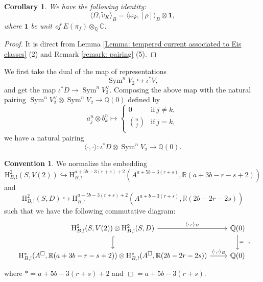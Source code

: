 \documentclass[11pt, a4paper]{amsart}
\theoremstyle{plain}
\newtheorem{corollary}[theorem]{Corollary}
\theoremstyle{definition}
\newtheorem{convention}[theorem]{Convention}
\numberwithin{equation}{section}
\def\CC{\mathbb{C}}
\def\QQ{\mathbb{Q}}
\def\RR{\mathbb{R}}
\DeclareMathOperator{\Sym}{Sym}
\begin{document}
\begin{corollary}
\label{corollary: Omega pairing in terms of omega paring with rho}
    We have the following identity: 
    \begin{equation*}
        \langle \Omega, \tilde{v}_{K} \rangle_{B} = \langle \omega_{\Psi}, [\rho] \rangle_{B} \otimes \mathbf{1}, 
    \end{equation*}
    where $\mathbf{1}$ be unit of $E(\pi_f) \otimes_{\QQ} \CC$. 
\end{corollary}

\begin{proof}
    It is direct from Lemma \ref{Lemma: tempered current associated to Eis classes} (2) and Remark \ref{remark: pairing} (5). 
\end{proof}

We first take the dual of the map of representations
\begin{equation*}
    \Sym^{n}V_{2} \hookrightarrow \iota^{*} V,
\end{equation*}
 and get the map $\iota^{*} D \rightarrow \Sym^{n}V_{2}^{\vee} $. 
Composing the above map with the natural pairing $\Sym^{n}V_2^{\vee} \otimes \Sym^{n} V_2 \rightarrow \QQ(0)$ defined by 
\begin{equation*}
    a^{n}_{j} \otimes b^{n}_{k} \mapsto \begin{cases}
                                            0 & \text{if} \ j \neq k, \\
                                            \binom{n}{j} & \text{if} \ j = k,   \\
                                        \end{cases}
\end{equation*}
we have a natural pairing 
\begin{equation*}
    \langle \cdot, \cdot \rangle \colon \iota^{*}D \otimes \Sym^{n} V_2 \rightarrow \QQ(0). 
\end{equation*} 

\begin{convention}
We normalize the embedding 
\begin{equation*}
\mathrm{H}^{2}_{B, !}(S, V(2)) \hookrightarrow \mathrm{H}^{a + 5b - 3(r + s) + 2}_{B, !}(A^{a + 5b - 3(r + s)}, \RR(a + 3b -r -s + 2))
\end{equation*}
and 
\begin{equation*}
\mathrm{H}^{2}_{B, !}(S, D) \hookrightarrow \mathrm{H}^{a + 5b - 3(r + s) + 2}_{B, !}(A^{a + b - 3(r + s)}, \RR(2b - 2r - 2s))
\end{equation*}
such that we have the following commutative diagram: 
\[
    \begin{tikzcd}
        \mathrm{H}^{2}_{B, !}(S, V(2)) \otimes \mathrm{H}^{2}_{B, !}(S, D)  \ar[d, hook] \ar[r,"{\langle \cdot , \cdot \rangle_B}"] & \QQ(0) \ar[d, "="] \\
        \mathrm{H}^{*}_{B, !}(A^{\Box}, \RR(a + 3b -r - s + 2)) \otimes \mathrm{H}^{*}_{B, !}(A^{\Box}, \RR(2b - 2r -2s )) \ar[r,"{\langle \cdot, \cdot \rangle_B}"] & \QQ(0)
    \end{tikzcd}, 
\]
where $* = a + 5b - 3(r + s) + 2$ and $\Box = a + 5b - 3(r + s)$. 
\end{convention}
\end{document}
